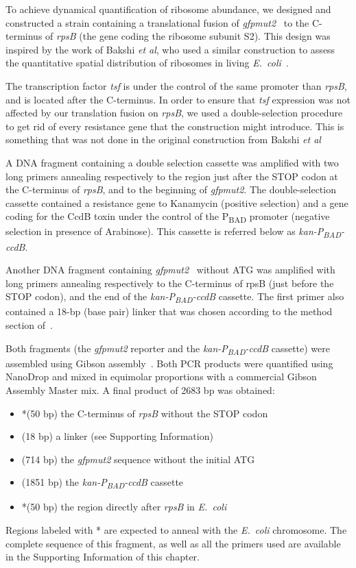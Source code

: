 To achieve dynamical quantification of ribosome abundance, we designed and constructed a strain containing a translational fusion of \textit{gfpmut2}~\cite{zaslaver_comprehensive_2006} to the C-terminus of \textit{rpsB} (the gene coding the ribosome subunit S2).
This design was inspired by the work of Bakshi \textit{et al}, who used a similar construction to assess the quantitative spatial distribution of ribosomes in living \textit{E.~coli}~\cite{bakshi_superresolution_2012}.

The transcription factor \textit{tsf} is under the control of the same promoter than \textit{rpsB}, and is located after the C-terminus.
In order to ensure that \textit{tsf} expression was not affected by our translation fusion on \textit{rpsB}, we used a double-selection procedure to get rid of every resistance gene that the construction might introduce.
This is something that was not done in the original construction from Bakshi \textit{et al}~\cite{bakshi_superresolution_2012}

A DNA fragment containing a double selection cassette was amplified with two long primers annealing respectively to the region just after the STOP codon at the C-terminus of \textit{rpsB}, and to the beginning of \textit{gfpmut2}.
The double-selection cassette contained a resistance gene to Kanamycin (positive selection) and a gene coding for the CcdB toxin under the control of the P\textsubscript{BAD} promoter (negative selection in presence of Arabinose).
This cassette is referred below as \textit{kan-P\textsubscript{BAD}-ccdB}.

Another DNA fragment containing \textit{gfpmut2}~\cite{zaslaver_comprehensive_2006} without ATG was amplified with long primers annealing respectively to the C-terminus of rpsB (just before the STOP codon), and the end of the \textit{kan-P\textsubscript{BAD}-ccdB} cassette.
The first primer also contained a 18-bp (base pair) linker that was chosen according to the method section of~\cite{bakshi_superresolution_2012}.

Both fragments (the \textit{gfpmut2} reporter and the \textit{kan-P\textsubscript{BAD}-ccdB} cassette) were assembled using Gibson assembly~\cite{gibson_enzymatic_2009}.
Both PCR products were quantified using NanoDrop and mixed in equimolar proportions with a commercial Gibson Assembly Master mix.
A final product of 2683 bp was obtained:
\begin{itemize}
\item *(50 bp) the C-terminus of \textit{rpsB} without the STOP codon 
\item (18 bp) a linker (see Supporting Information)
\item (714 bp) the \textit{gfpmut2} sequence without the initial ATG
\item (1851 bp) the \textit{kan-P\textsubscript{BAD}-ccdB} cassette
\item *(50 bp) the region directly after \textit{rpsB} in \textit{E.~coli}
\end{itemize}
Regions labeled with * are expected to anneal with the \textit{E.~coli} chromosome.
The complete sequence of this fragment, as well as all the primers used are available in the Supporting Information of this chapter.

